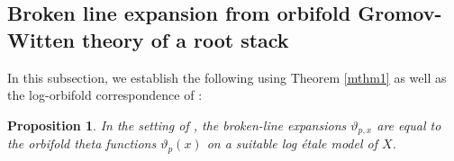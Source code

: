 \documentclass[12pt, oneside]{amsart}   	%
\newcounter{thm}
\newtheorem{proposition}[thm]{Proposition}
\newtheorem{corollary}[thm]{Corollary}
\numberwithin{equation}{section}
\numberwithin{thm}{section}
\numberwithin{figure}{section}
\begin{document}
\subsection{Broken line expansion from orbifold Gromov-Witten theory of a root stack}

In this subsection, we establish the following using Theorem \ref{mthm1} as well as the log-orbifold correspondence of \cite{BNR2}:

\begin{proposition}\label{blorb}
In the setting of \cite{int_mirror}, the broken-line expansions $\vartheta_{p,x}$ are equal to the orbifold theta functions $\vartheta_{p}(x)$ on a suitable log \'etale model of $X$. 
\end{proposition}






%


 
\end{document}
